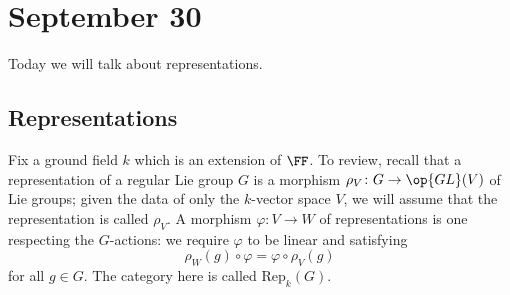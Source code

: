 \documentclass[../notes.tex]{subfiles}
\begin{document}
\section{September 30}
Today we will talk about representations.

\subsection{Representations}
Fix a ground field $k$ which is an extension of $\FF$. To review, recall that a representation of a regular Lie group $G$ is a morphism $\rho_V\colon G\to\op{GL}(V)$ of Lie groups; given the data of only the $k$-vector space $V$, we will assume that the representation is called $\rho_V$. A morphism $\varphi\colon V\to W$ of representations is one respecting the $G$-actions: we require $\varphi$ to be linear and satisfying
\[\rho_W(g)\circ\varphi=\varphi\circ\rho_V(g)\]
for all $g\in G$. The category here is called $\mathrm{Rep}_k(G)$.
\end{document}
